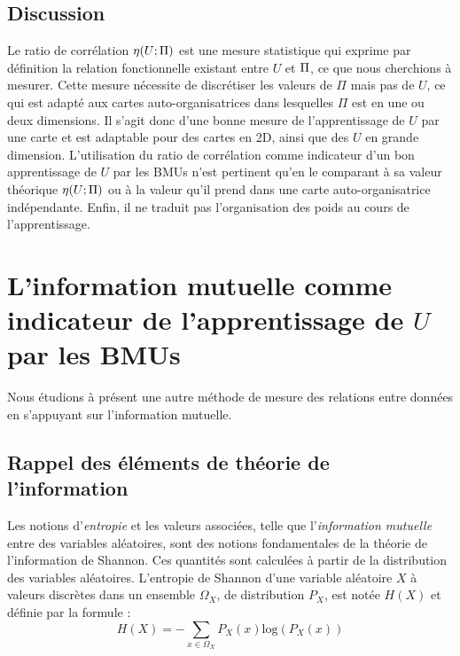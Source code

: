 \documentclass[../main]{subfiles}
\begin{document}
\subsection{Discussion}

Le ratio de corrélation $\eta(U;\Pi)$ est une mesure statistique qui exprime par définition la relation fonctionnelle existant entre $U$ et $\Pi$, ce que nous cherchions à mesurer. 
Cette mesure nécessite de discrétiser les valeurs de $\Pi$ mais pas de $U$, ce qui est adapté aux cartes auto-organisatrices dans lesquelles $\Pi$ est en une ou deux dimensions. Il s'agit donc d'une bonne mesure de l'apprentissage de $U$ par une carte et est adaptable pour des cartes en 2D, ainsi que des $U$ en grande dimension.
L'utilisation du ratio de corrélation comme indicateur d'un bon apprentissage de $U$ par les BMUs n'est pertinent qu'en le comparant à sa valeur théorique $\eta(U;\Pi)$ ou à la valeur qu'il prend dans une carte auto-organisatrice indépendante.
Enfin, il ne traduit pas l'organisation des poids au cours de l'apprentissage.
\section{L'information mutuelle comme indicateur de l'apprentissage de $U$ par les BMUs}

Nous étudions à présent une autre méthode de mesure des relations entre données en s'appuyant sur l'information mutuelle.
\subsection{Rappel des éléments de théorie de l'information}

Les notions d'\emph{entropie} et les valeurs associées, telle que l'\emph{information mutuelle} entre des variables aléatoires, sont des notions fondamentales de la théorie de l'information de Shannon. Ces quantités sont calculées à partir de la distribution des variables aléatoires.
L'entropie de Shannon d'une variable aléatoire $X$ à valeurs discrètes dans un ensemble $\Omega_X$, de distribution $P_X$, est notée $H(X)$ et définie par la formule : 
\begin{equation}
H(X) = - \sum_{x \in \Omega_X}{P_X(x)\textrm{log}(P_X(x))}
\end{equation}
\end{document}
